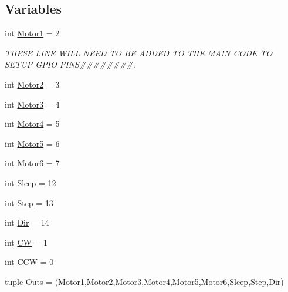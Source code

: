 \subsection*{Variables}
\begin{DoxyCompactItemize}
\item 
int \hyperlink{namespacemotors_a2a0f2bdf759a7ed361344e5c637da1a4}{Motor1} = 2
\begin{DoxyCompactList}\small\item\em T\+H\+E\+SE L\+I\+NE W\+I\+LL N\+E\+ED TO BE A\+D\+D\+ED TO T\+HE M\+A\+IN C\+O\+DE TO S\+E\+T\+UP G\+P\+IO P\+I\+NS\#\#\#\#\#\#\#\#. \end{DoxyCompactList}\item 
int \hyperlink{namespacemotors_a6e24b790ad4673224f7e9b6a7e8b2a50}{Motor2} = 3
\item 
int \hyperlink{namespacemotors_aa499e40f0b00e705e97b7b064b5c806d}{Motor3} = 4
\item 
int \hyperlink{namespacemotors_aa2ad6faa810440e071b919c54ddeac2b}{Motor4} = 5
\item 
int \hyperlink{namespacemotors_a7b01a84984168dcfeeb9f33d020f7d38}{Motor5} = 6
\item 
int \hyperlink{namespacemotors_a0f78268a0cef59be9898e8fdfb689c74}{Motor6} = 7
\item 
int \hyperlink{namespacemotors_a0612d2632b6b8107d3a0443f6df076c4}{Sleep} = 12
\item 
int \hyperlink{namespacemotors_a19f3c46dd2407b6b3c4ce3d50d7a6af1}{Step} = 13
\item 
int \hyperlink{namespacemotors_a673b1a4da4b1bffaca2fc8870bda1d81}{Dir} = 14
\item 
int \hyperlink{namespacemotors_af9c37a6599299d3cbe3b79c2972f42dd}{CW} = 1
\item 
int \hyperlink{namespacemotors_a793b26c4a831a9108835258e0d859672}{C\+CW} = 0
\item 
tuple \hyperlink{namespacemotors_aed37b3cce8f8d9ef7ecc6860b4970527}{Outs} = (\hyperlink{namespacemotors_a2a0f2bdf759a7ed361344e5c637da1a4}{Motor1},\hyperlink{namespacemotors_a6e24b790ad4673224f7e9b6a7e8b2a50}{Motor2},\hyperlink{namespacemotors_aa499e40f0b00e705e97b7b064b5c806d}{Motor3},\hyperlink{namespacemotors_aa2ad6faa810440e071b919c54ddeac2b}{Motor4},\hyperlink{namespacemotors_a7b01a84984168dcfeeb9f33d020f7d38}{Motor5},\hyperlink{namespacemotors_a0f78268a0cef59be9898e8fdfb689c74}{Motor6},\hyperlink{namespacemotors_a0612d2632b6b8107d3a0443f6df076c4}{Sleep},\hyperlink{namespacemotors_a19f3c46dd2407b6b3c4ce3d50d7a6af1}{Step},\hyperlink{namespacemotors_a673b1a4da4b1bffaca2fc8870bda1d81}{Dir})
\end{DoxyCompactItemize}


